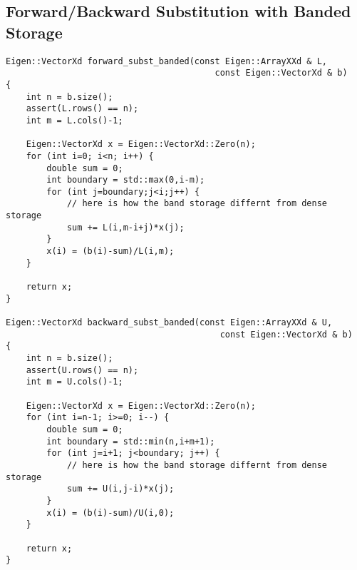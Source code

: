 \documentclass[paper=a4, fontsize=11pt]{scrartcl} %
\numberwithin{equation}{section} %
\numberwithin{figure}{section} %
\numberwithin{table}{section} %
\begin{document}
\subsection{Forward/Backward Substitution with Banded Storage}
\begin{lstlisting}
Eigen::VectorXd forward_subst_banded(const Eigen::ArrayXXd & L,
                                         const Eigen::VectorXd & b)
{
    int n = b.size();
    assert(L.rows() == n);
    int m = L.cols()-1;

    Eigen::VectorXd x = Eigen::VectorXd::Zero(n);
    for (int i=0; i<n; i++) {
        double sum = 0;
        int boundary = std::max(0,i-m);
        for (int j=boundary;j<i;j++) {
            // here is how the band storage differnt from dense storage
            sum += L(i,m-i+j)*x(j);
        }
        x(i) = (b(i)-sum)/L(i,m);
    }

    return x;
}

Eigen::VectorXd backward_subst_banded(const Eigen::ArrayXXd & U,
                                          const Eigen::VectorXd & b)
{
    int n = b.size();
    assert(U.rows() == n);
    int m = U.cols()-1;

    Eigen::VectorXd x = Eigen::VectorXd::Zero(n);
    for (int i=n-1; i>=0; i--) {
        double sum = 0;
        int boundary = std::min(n,i+m+1);
        for (int j=i+1; j<boundary; j++) {
            // here is how the band storage differnt from dense storage
            sum += U(i,j-i)*x(j);
        }
        x(i) = (b(i)-sum)/U(i,0);
    }

    return x;
}
\end{lstlisting}

\newpage
\end{document}
